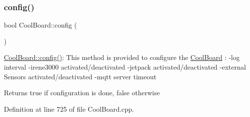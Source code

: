 \mbox{\label{class_cool_board_a583a874c09c07e70a6eb9229fc4beddb}} 
\subsubsection{\texorpdfstring{config()}{config()}}
{\footnotesize\ttfamily bool Cool\+Board\+::config (\begin{DoxyParamCaption}{ }\end{DoxyParamCaption})}

\hyperlink{class_cool_board_a583a874c09c07e70a6eb9229fc4beddb}{Cool\+Board\+::config()}\+: This method is provided to configure the \hyperlink{class_cool_board}{Cool\+Board} \+: -\/log interval -\/irene3000 activated/deactivated -\/jetpack activated/deactivated -\/external Sensors activated/deactivated -\/mqtt server timeout

\begin{DoxyReturn}{Returns}
true if configuration is done, false otherwise 
\end{DoxyReturn}


Definition at line 725 of file Cool\+Board.\+cpp.


